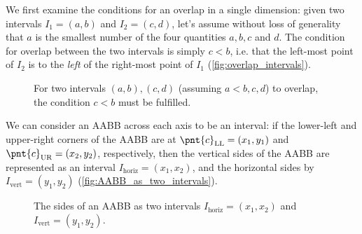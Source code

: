 We first examine the conditions for an overlap in a single dimension: given two intervals $I_{1}=(a,b)$ and $I_{2}=(c,d)$, let's assume without loss of generality that $a$ is the smallest number of the four quantities $a,b,c$ and $d$. The condition for overlap between the two intervals is simply $c<b$, i.e. that the left-most point of $I_{2}$ is to the \textit{left} of the right-most point of $I_{1}$ (\autoref{fig:overlap_intervals}).

\begin{figure}
	\forcecaptionside
	\begin{center}
	\end{center}
	\caption{For two intervals $(a,b),(c,d)$ (assuming $a<b,c,d$) to overlap, the condition $c<b$ must be fulfilled.}
	\label{fig:overlap_intervals}
\end{figure}

We can consider an AABB across each axis to be an interval: if the lower-left and upper-right corners of the AABB are at $\pnt{c}_{\text{LL}}=\left(x_{1},y_{1}\right)$ and $\pnt{c}_{\text{UR}}=\left(x_{2},y_{2}\right)$, respectively, then the vertical sides of the AABB are represented as an interval $I_{\text{horiz}}=\left(x_{1},x_{2}\right)$, and the horizontal sides by $I_{\text{vert}}=\left(y_{1},y_{2}\right)$ (\autoref{fig:AABB_as_two_intervals}).

\begin{figure}
	\begin{center}
	\end{center}
	\caption{The sides of an AABB as two intervals $I_{\text{horiz}}=\left(x_{1},x_{2}\right)$ and $I_{\text{vert}}=\left(y_{1},y_{2}\right)$.}
	\label{fig:AABB_as_two_intervals}
\end{figure}

